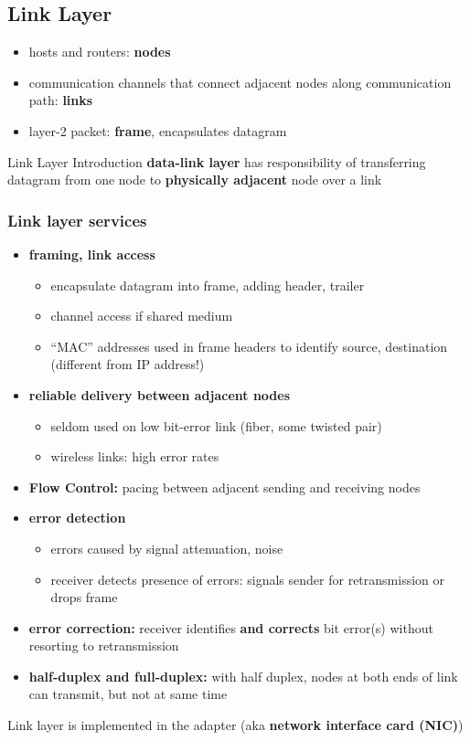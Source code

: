 \subsection{Link Layer}
\begin{itemize}
	\item hosts and routers: \textbf{nodes}
	\item communication channels that connect adjacent nodes along communication path: \textbf{links}
	\item layer-2 packet: \textbf{frame}, encapsulates datagram
\end{itemize}
\begin{note}{Link Layer Introduction}
	\textbf{data-link layer} has responsibility of transferring datagram from one node to \textbf{physically adjacent} node over a link
\end{note}
\subsubsection{Link layer services}
\begin{itemize}
	\item \textbf{framing, link access}
	\begin{itemize}
		\item encapsulate datagram into frame, adding header, trailer
		\item channel access if shared medium
		\item ``MAC'' addresses used in frame headers to identify source, destination (different from IP address!)
	\end{itemize}
	\item \textbf{reliable delivery between adjacent nodes}
	\begin{itemize}
		\item seldom used on low bit-error link (fiber, some twisted pair)
		\item wireless links: high error rates
	\end{itemize}
	\item \textbf{Flow Control:} pacing between adjacent sending and receiving nodes
	\item \textbf{error detection}
	\begin{itemize}
		\item errors caused by signal attenuation, noise
		\item receiver detects presence of errors: signals sender for retransmission or drops frame
	\end{itemize}
	\item \textbf{error correction:} receiver identifies \textbf{and corrects} bit error(s) without resorting to retransmission
	\item \textbf{half-duplex and full-duplex:} with half duplex, nodes at both ends of link can transmit, but not at same time
\end{itemize}
Link layer is implemented in the adapter (aka \textbf{network interface card (NIC)})

